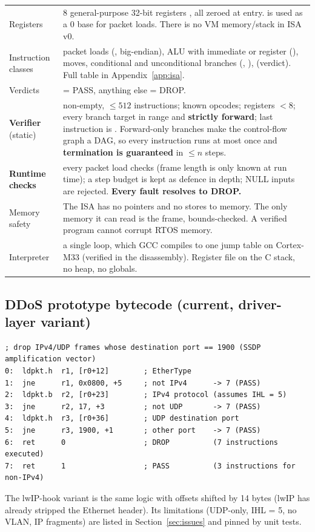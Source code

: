 \documentclass[10pt,a4paper]{article}
\begin{document}
\begin{tabularx}{\textwidth}{@{}P{3.0cm}L@{}}
\toprule
Registers & 8 general-purpose 32-bit registers , all zeroed at entry.  is used as a 0 base for packet loads. There is no VM memory/stack in ISA v0. \\
Instruction classes & packet loads (, big-endian), ALU with immediate or register (), moves, conditional and unconditional branches (, ),  (verdict). Full table in Appendix~\ref{app:isa}. \\
Verdicts &  = PASS, anything else = DROP. \\
\textbf{Verifier} (static) & non-empty, $\le 512$ instructions; known opcodes; registers $< 8$; every branch target in range and \textbf{strictly forward}; last instruction is . Forward-only branches make the control-flow graph a DAG, so every instruction runs at most once and \textbf{termination is guaranteed} in $\le n$ steps. \\
\textbf{Runtime checks} & every packet load checks  (frame length is only known at run time); a step budget is kept as defence in depth; NULL inputs are rejected. \textbf{Every fault resolves to DROP.} \\
Memory safety & The ISA has no pointers and no stores to memory. The only memory it can read is the frame, bounds-checked. A verified program cannot corrupt RTOS memory. \\
Interpreter & a single  loop, which GCC compiles to one  jump table on Cortex-M33 (verified in the disassembly). Register file on the C stack, no heap, no globals. \\
\bottomrule
\end{tabularx}

\subsection{DDoS prototype bytecode (current, driver-layer variant)}
\begin{lstlisting}[style=bc]
; drop IPv4/UDP frames whose destination port == 1900 (SSDP amplification vector)
0:  ldpkt.h  r1, [r0+12]        ; EtherType
1:  jne      r1, 0x0800, +5     ; not IPv4      -> 7 (PASS)
2:  ldpkt.b  r2, [r0+23]        ; IPv4 protocol (assumes IHL = 5)
3:  jne      r2, 17, +3         ; not UDP       -> 7 (PASS)
4:  ldpkt.h  r3, [r0+36]        ; UDP destination port
5:  jne      r3, 1900, +1       ; other port    -> 7 (PASS)
6:  ret      0                  ; DROP          (7 instructions executed)
7:  ret      1                  ; PASS          (3 instructions for non-IPv4)
\end{lstlisting}
The lwIP-hook variant is the same logic with offsets shifted by 14 bytes (lwIP has already stripped the Ethernet header). Its limitations (UDP-only, IHL = 5, no VLAN, IP fragments) are listed in Section~\ref{sec:issues} and pinned by unit tests.
\end{document}
